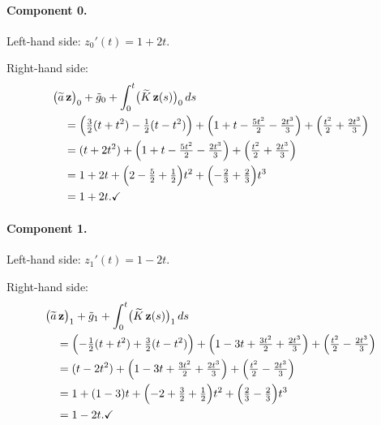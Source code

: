 \documentclass[11pt]{article}
\begin{document}
\paragraph{Component 0.}

Left-hand side: $z_0'(t) = 1+2t$.

Right-hand side:
\begin{align*}
  &\bigl(\widetilde{a}\,\mathbf{z}\bigr)_0
   + \tilde{g}_0
   + \int_0^t\bigl(\widetilde{K}\,\mathbf{z}(s)\bigr)_0\,ds \\
  &\quad= \Bigl(\tfrac{3}{2}(t+t^2)-\tfrac{1}{2}(t-t^2)\Bigr)
         + \Bigl(1+t-\tfrac{5t^2}{2}-\tfrac{2t^3}{3}\Bigr)
         + \Bigl(\tfrac{t^2}{2}+\tfrac{2t^3}{3}\Bigr) \\
  &\quad= (t+2t^2)
         + \Bigl(1+t-\tfrac{5t^2}{2}-\tfrac{2t^3}{3}\Bigr)
         + \Bigl(\tfrac{t^2}{2}+\tfrac{2t^3}{3}\Bigr) \\
  &\quad= 1 + 2t + \Bigl(2-\tfrac{5}{2}+\tfrac{1}{2}\Bigr)t^2
              + \Bigl(-\tfrac{2}{3}+\tfrac{2}{3}\Bigr)t^3 \\
  &\quad= 1+2t. \checkmark
\end{align*}

\paragraph{Component 1.}

Left-hand side: $z_1'(t) = 1-2t$.

Right-hand side:
\begin{align*}
  &\bigl(\widetilde{a}\,\mathbf{z}\bigr)_1
   + \tilde{g}_1
   + \int_0^t\bigl(\widetilde{K}\,\mathbf{z}(s)\bigr)_1\,ds \\
  &\quad= \Bigl(-\tfrac{1}{2}(t+t^2)+\tfrac{3}{2}(t-t^2)\Bigr)
         + \Bigl(1-3t+\tfrac{3t^2}{2}+\tfrac{2t^3}{3}\Bigr)
         + \Bigl(\tfrac{t^2}{2}-\tfrac{2t^3}{3}\Bigr) \\
  &\quad= (t-2t^2)
         + \Bigl(1-3t+\tfrac{3t^2}{2}+\tfrac{2t^3}{3}\Bigr)
         + \Bigl(\tfrac{t^2}{2}-\tfrac{2t^3}{3}\Bigr) \\
  &\quad= 1 + (1-3)t + \Bigl(-2+\tfrac{3}{2}+\tfrac{1}{2}\Bigr)t^2
              + \Bigl(\tfrac{2}{3}-\tfrac{2}{3}\Bigr)t^3 \\
  &\quad= 1-2t. \checkmark
\end{align*}
\end{document}
